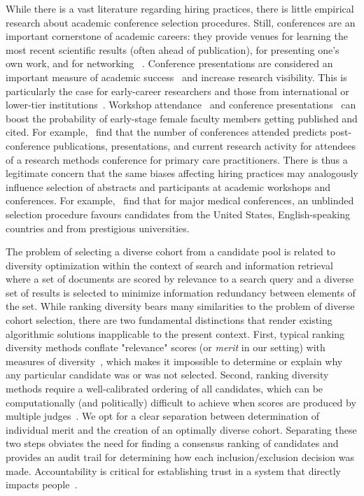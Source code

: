 \documentclass[10pt,letterpaper]{article}
\begin{document}
While there is a vast literature regarding hiring practices, there is little empirical research about academic conference selection procedures. Still, conferences are an important cornerstone of academic careers: they provide venues for learning the most recent scientific results (often ahead of publication), for presenting one's own work, and for networking ~\cite{nicolson2016}. Conference presentations are considered an important measure of academic success~\cite{Buddeberg-Fischer2008} and increase research visibility. This is particularly the case for early-career researchers and those from international or lower-tier institutions~\cite{leite2014}. Workshop attendance~\cite{blau2010} and conference presentations~\cite{housri2008} can boost the probability of early-stage female faculty members getting published and cited. For example,~\cite{katerndahl1999} find that the number of conferences attended predicts post-conference publications, presentations, and current research activity for attendees of a research methods conference for primary care practitioners. 
There is thus a legitimate concern that the same biases affecting hiring practices may analogously influence selection of abstracts and participants at academic workshops and conferences. For example,~\cite{ross2006} find that for major medical conferences, an unblinded selection procedure favours candidates from the United States, English-speaking countries and from prestigious universities. 

The problem of selecting a diverse cohort from a candidate pool is related to diversity optimization within the context of search and information retrieval~\cite{carbonell1998use} where a set of documents are scored by relevance to a search query and a diverse set of results is selected to minimize information redundancy between elements of the set.
While ranking diversity bears many similarities to the problem of diverse cohort selection, there are two fundamental distinctions that render existing algorithmic solutions inapplicable to the present context.
First, typical ranking diversity methods conflate "relevance" scores (or \emph{merit} in our setting) with measures of diversity~\cite{clarke2008novelty}, which makes it impossible to determine or explain why any particular candidate was or was not selected.
Second, ranking diversity methods require a well-calibrated ordering of all candidates, which can be computationally (and politically) difficult to achieve when scores are produced by multiple judges~\cite{dwork2001rank}.
We opt for a clear separation between determination of individual merit and the creation of an optimally diverse cohort. Separating these two steps obviates the need for finding a consensus ranking of candidates and provides an audit trail for determining how each inclusion/exclusion decision was made. Accountability is critical for establishing trust in a system that directly impacts people~\cite{fatml}.
\end{document}
